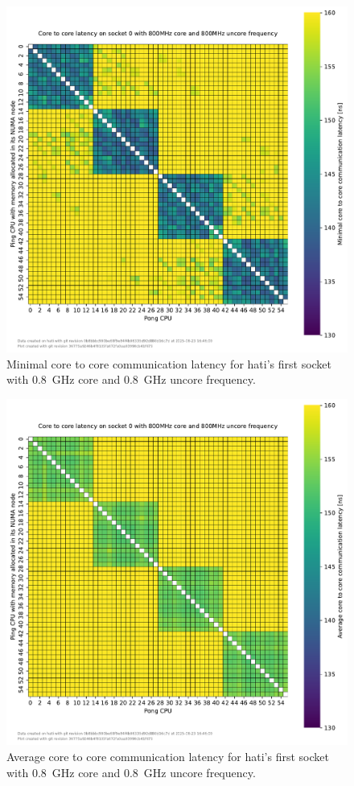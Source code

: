 \begin{figure}[]
    \centering
    \includegraphics[width=\columnwidth]{fig/core-to-core-latency/core-to-core-heatmap-min-800-800.pdf}
    \caption{Minimal core to core communication latency for hati's first socket with \SI{0.8}{\GHz} core and \SI{0.8}{\GHz} uncore frequency.}
\end{figure}
\begin{figure}[]
    \centering
    \includegraphics[width=\columnwidth]{fig/core-to-core-latency/core-to-core-heatmap-avg-800-800.pdf}
    \caption{Average core to core communication latency for hati's first socket with \SI{0.8}{\GHz} core and \SI{0.8}{\GHz} uncore frequency.}
\end{figure}
